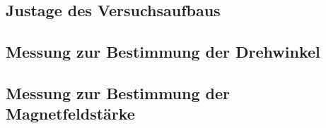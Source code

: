 \subsection{Justage des Versuchsaufbaus}
\label{sub:Justage}

\subsection{Messung zur Bestimmung der Drehwinkel}
\label{sub:Drehwinkel}

\subsection{Messung zur Bestimmung der Magnetfeldstärke}
\label{sub:Magnetfeld}




